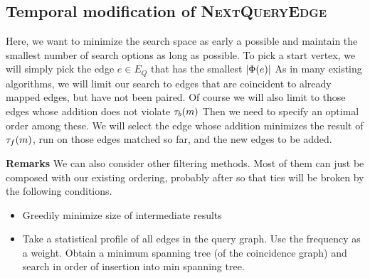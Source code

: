 \subsection{Temporal modification of \textsc{NextQueryEdge}}
\label{sec:next_query_edge}

Here, we want to minimize the search space as early a possible and maintain the
smallest number of search options as long as possible. To pick a start vertex,
we will simply pick the edge $e \in E_Q$ that has the smallest $|\Phi(e)|$
As in many existing algorithms, \cite{2004-PAMI-VF2, 2009-EDBT-GADDI,
  2008-SIGMOD-GraphQL} we will limit our search to edges that are coincident to
already mapped edges, but have not been paired. Of course we will also limit to
those edges whose addition does not violate $\tau_b(m)$ Then we need to
specify an optimal order among these.  We will select the edge whose addition
minimizes the result of $\tau_f(m)$, run on those edges matched so far, and
the new edges to be added.

\textbf{Remarks}
We can also consider other filtering methods.  Most of them can just be composed
with our existing ordering, probably after so that ties will be broken by the
following conditions.
\begin{itemize}
  \item Greedily minimize size of intermediate results \cite{2008-SIGMOD-GraphQL} 
  \item Take a statistical profile of all edges in the query graph. Use the
    frequency as a weight. Obtain a minimum spanning tree (of the coincidence
    graph) and search in order of insertion into min spanning
    tree. \cite{2008-VLDB-QuickSI}
\end{itemize}
